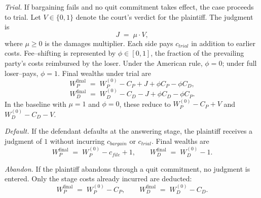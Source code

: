 \documentclass{article}
\begin{document}
\emph{Trial.} If bargaining fails and no quit commitment takes effect, the case proceeds to trial. Let $V\in\{0,1\}$ denote the court’s verdict for the plaintiff. The judgment is
\[
J \;=\; \mu \cdot V,
\]
where $\mu\ge 0$ is the damages multiplier. Each side pays $c_{trial}$ in addition to earlier costs. Fee–shifting is represented by $\phi\in[0,1]$, the fraction of the prevailing party’s costs reimbursed by the loser. Under the American rule, $\phi=0$; under full loser–pays, $\phi=1$. Final wealths under trial are
\[
W_P^{\mathrm{final}}
\;=\;
W_P^{(0)} - C_P + J + \phi C_P - \phi C_D,
\]
\[
W_D^{\mathrm{final}}
\;=\;
W_D^{(0)} - C_D - J + \phi C_D - \phi C_P.
\]
In the baseline with $\mu=1$ and $\phi=0$, these reduce to $W_P^{(0)}-C_P+V$ and $W_D^{(0)}-C_D-V$.

\emph{Default.} If the defendant defaults at the answering stage, the plaintiff receives a judgment of $1$ without incurring $c_{bargain}$ or $c_{trial}$. Final wealths are
\[
W_P^{\mathrm{final}} \;=\; W_P^{(0)} - c_{file} + 1,
\qquad
W_D^{\mathrm{final}} \;=\; W_D^{(0)} - 1.
\]

\emph{Abandon.} If the plaintiff abandons through a quit commitment, no judgment is entered. Only the stage costs already incurred are deducted:
\[
W_P^{\mathrm{final}} \;=\; W_P^{(0)} - C_P,
\qquad
W_D^{\mathrm{final}} \;=\; W_D^{(0)} - C_D.
\]




\printbibliography
\end{document}
